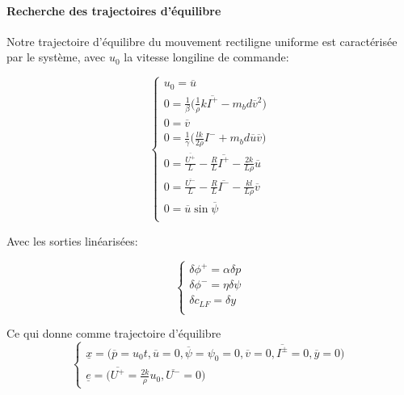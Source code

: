 \documentclass{report}
\begin{document}
\paragraph{Recherche des trajectoires d'équilibre}

Notre trajectoire d'équilibre du mouvement rectiligne uniforme 
est caractérisée par le système, avec $u_0$ 
la vitesse longiline de commande:

\begin{equation*}
    \begin{cases}
        u_0 = \overline{u} \\
        0 = \frac{1}{\beta}\big( \frac{1}{\rho}k\overline{I^{+}} - m_bd\overline{v}^2 \big) \\
        0 = \overline{v} \\
        0 = \frac{1}{\gamma}\big( \frac{lk}{2\rho}I^{-} + m_bd\overline{u}\overline{v} \big) \\
        0 = \frac{\overline{U^{+}}}{L} - \frac{R}{L}\overline{I^{+}} - \frac{2k}{L\rho}\overline{u} \\
        0 = \frac{\overline{U^{-}}}{L} - \frac{R}{L}\overline{I^{-}} - \frac{kl}{L\rho}\overline{v} \\
        0 = \overline{u}\sin\overline{\psi} \\
    \end{cases}
\end{equation*}

Avec les sorties linéarisées:

\begin{equation*}
    \begin{cases}
        \delta \phi^{+} = \alpha \delta p \\
        \delta \phi^{-} = \eta \delta \psi \\
        \delta c_{LF} = \delta y \\
    \end{cases}
\end{equation*}

Ce qui donne comme trajectoire d'équilibre 
\begin{equation*}
    \begin{cases}
        \underline{x} = \big(\overline{p}=u_0t, \overline{u}=0, \overline{\psi}=\psi_0=0, 
        \overline{v}=0, \overline{I^{\pm}}=0, \overline{y}=0 \big) \\
        \underline{e} = \big( \overline{U^{+}}=\frac{2k}{\rho} u_0, \overline{U^{-}}=0 \big)
    \end{cases}
\end{equation*}
\end{document}

